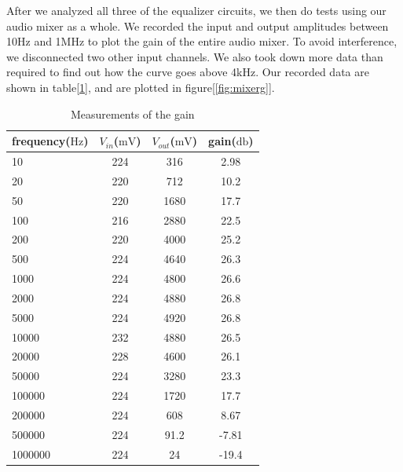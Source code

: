 \phantom{ } After we analyzed all three of the equalizer circuits, we then do tests using our audio mixer as a whole. We recorded the input and output amplitudes between 10Hz and 1MHz to plot the gain of the entire audio mixer. To avoid interference, we disconnected two other input channels. We also took down more data than required to find out how the curve goes above 4kHz. Our recorded data are shown in table[\ref{tab:datagain}], and are plotted in figure[\ref{fig:mixerg}].\\

\begin{table}[!htbp]
	\centering
	\caption{Measurements of the gain}
	\label{tab:datagain}
	\begin{tabular}{lccc}
		\toprule
		frequency($\si{\hertz}$) & $V_{in}$($\si{\milli\volt}$) & $V_{out}$($\si{\milli\volt}$) & gain($\si{\decibel}$) \\
		\midrule
		10	&224&	316&	2.98\\
		20	&220&	712&	10.2\\
		50	&220&	1680&	17.7\\
		100	&216&	2880&	22.5\\
		200	&220&	4000&	25.2\\
		500	&224&	4640&	26.3\\
		1000&	224&	4800&	26.6\\
		2000&	224&	4880&	26.8\\
		5000&	224&	4920&	26.8\\
		10000&	232&	4880&	26.5\\
		20000&	228&	4600&	26.1\\
		50000&	224&	3280&	23.3\\
		100000&	224&	1720&	17.7\\
		200000&	224&	608&	8.67\\
		500000&	224&	91.2&	-7.81\\
		1000000&	224&	24&	-19.4\\
		\bottomrule
	\end{tabular}
\end{table}

